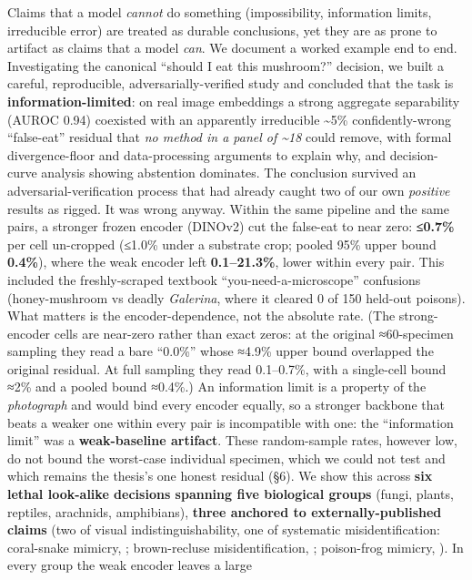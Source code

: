 Claims that a model \emph{cannot} do something (impossibility,
information limits, irreducible error) are treated as durable
conclusions, yet they are as prone to artifact as claims that a model
\emph{can}. We document a worked example end to end. Investigating the
canonical ``should I eat this mushroom?'' decision, we built a careful,
reproducible, adversarially-verified study and concluded that the task
is \textbf{information-limited}: on real image embeddings a strong
aggregate separability (AUROC 0.94) coexisted with an apparently
irreducible \textasciitilde5\% confidently-wrong ``false-eat'' residual
that \emph{no method in a panel of \textasciitilde18} could remove, with
formal divergence-floor and data-processing arguments to explain why,
and decision-curve analysis showing abstention dominates. The conclusion
survived an adversarial-verification process that had already caught two
of our own \emph{positive} results as rigged. It was wrong anyway.
Within the same pipeline and the same pairs, a stronger frozen encoder
(DINOv2) cut the false-eat to near zero: \textbf{≤0.7\%} per cell
un-cropped (≤1.0\% under a substrate crop; pooled 95\% upper bound
\textbf{0.4\%}), where the weak encoder left \textbf{0.1--21.3\%}, lower
within every pair. This included the freshly-scraped textbook
``you-need-a-microscope'' confusions (honey-mushroom vs deadly
\emph{Galerina}, where it cleared 0 of 150 held-out poisons). What
matters is the encoder-dependence, not the absolute rate. (The
strong-encoder cells are near-zero rather than exact zeros: at the
original ≈60-specimen sampling they read a bare ``0.0\%'' whose ≈4.9\%
upper bound overlapped the original residual. At full sampling they read
0.1--0.7\%, with a single-cell bound ≈2\% and a pooled bound ≈0.4\%.) An
information limit is a property of the \emph{photograph} and would bind
every encoder equally, so a stronger backbone that beats a weaker one
within every pair is incompatible with one: the ``information limit''
was a \textbf{weak-baseline artifact}. These random-sample rates,
however low, do not bound the worst-case individual specimen, which we
could not test and which remains the thesis's one honest residual (§6).
We show this across \textbf{six lethal look-alike decisions spanning
five biological groups} (fungi, plants, reptiles, arachnids,
amphibians), \textbf{three anchored to externally-published claims} (two
of visual indistinguishability, one of systematic misidentification:
coral-snake mimicry, \citep{pfennig2001}; brown-recluse
misidentification, \citep{vetter2000}; poison-frog mimicry,
\citep{symula2001}). In every group the weak encoder leaves a large
